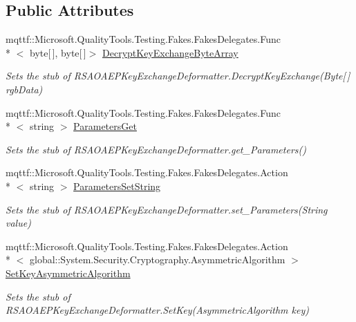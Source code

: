 \subsection*{Public Attributes}
\begin{DoxyCompactItemize}
\item 
mqttf\-::\-Microsoft.\-Quality\-Tools.\-Testing.\-Fakes.\-Fakes\-Delegates.\-Func\\*
$<$ byte\mbox{[}$\,$\mbox{]}, byte\mbox{[}$\,$\mbox{]}$>$ \hyperlink{class_system_1_1_security_1_1_cryptography_1_1_fakes_1_1_stub_r_s_a_o_a_e_p_key_exchange_deformatter_aefe2589612c69cd7060de186382d05b8}{Decrypt\-Key\-Exchange\-Byte\-Array}
\begin{DoxyCompactList}\small\item\em Sets the stub of R\-S\-A\-O\-A\-E\-P\-Key\-Exchange\-Deformatter.\-Decrypt\-Key\-Exchange(\-Byte\mbox{[}$\,$\mbox{]} rgb\-Data)\end{DoxyCompactList}\item 
mqttf\-::\-Microsoft.\-Quality\-Tools.\-Testing.\-Fakes.\-Fakes\-Delegates.\-Func\\*
$<$ string $>$ \hyperlink{class_system_1_1_security_1_1_cryptography_1_1_fakes_1_1_stub_r_s_a_o_a_e_p_key_exchange_deformatter_ae1e2cea68bbfbb7908c14a7ed88350c5}{Parameters\-Get}
\begin{DoxyCompactList}\small\item\em Sets the stub of R\-S\-A\-O\-A\-E\-P\-Key\-Exchange\-Deformatter.\-get\-\_\-\-Parameters()\end{DoxyCompactList}\item 
mqttf\-::\-Microsoft.\-Quality\-Tools.\-Testing.\-Fakes.\-Fakes\-Delegates.\-Action\\*
$<$ string $>$ \hyperlink{class_system_1_1_security_1_1_cryptography_1_1_fakes_1_1_stub_r_s_a_o_a_e_p_key_exchange_deformatter_aac36799b1c30324a6e92b8617de4857d}{Parameters\-Set\-String}
\begin{DoxyCompactList}\small\item\em Sets the stub of R\-S\-A\-O\-A\-E\-P\-Key\-Exchange\-Deformatter.\-set\-\_\-\-Parameters(\-String value)\end{DoxyCompactList}\item 
mqttf\-::\-Microsoft.\-Quality\-Tools.\-Testing.\-Fakes.\-Fakes\-Delegates.\-Action\\*
$<$ global\-::\-System.\-Security.\-Cryptography.\-Asymmetric\-Algorithm $>$ \hyperlink{class_system_1_1_security_1_1_cryptography_1_1_fakes_1_1_stub_r_s_a_o_a_e_p_key_exchange_deformatter_a69741e683c1cad48e8f0f8e54dbaadbc}{Set\-Key\-Asymmetric\-Algorithm}
\begin{DoxyCompactList}\small\item\em Sets the stub of R\-S\-A\-O\-A\-E\-P\-Key\-Exchange\-Deformatter.\-Set\-Key(\-Asymmetric\-Algorithm key)\end{DoxyCompactList}\end{DoxyCompactItemize}
